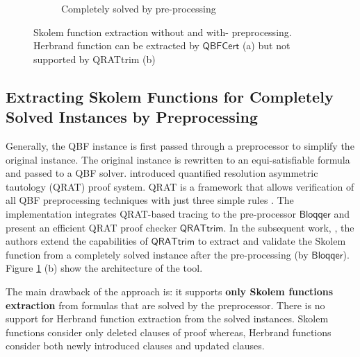 \documentclass[runningheads]{llncs}
\newcommand{\qrpcert}{\mathsf{QBFCert}}
\newcommand{\qtrim}{\mathsf{QRATtrim}}
\newcommand{\bloqqer}{\mathsf{Bloqqer}}
\newcommand{\cheskol}{\mathsf{cheskol}}
\newcommand{\0}{0}
\newcommand{\1}{1}
\begin{document}
\begin{figure}
\begin{subfigure}[t]{0.5\textwidth}
	\caption{Completely solved by pre-processing}
\end{subfigure}

\caption{Skolem function extraction without and with- preprocessing. Herbrand function can be extracted by $\qrpcert$ (a) but not supported by QRATtrim (b)}\label{fig:tool}
\end{figure}

\subsection{Extracting Skolem Functions for Completely Solved Instances by Preprocessing} \label{subsec:skolem-pre}

Generally, the QBF instance is first passed through a preprocessor to simplify the original instance. The original instance is rewritten to an equi-satisfiable formula and passed to a QBF solver. \cite{HeuleSB14a} introduced quantified resolution asymmetric tautology (QRAT) proof system. QRAT is a framework that allows verification of all QBF preprocessing techniques with just three simple rules \cite{HeuleSB14a}. The implementation integrates QRAT-based tracing to the pre-processor $\bloqqer$ \cite{Biere2011} and present an efficient QRAT proof checker $\qtrim$.
In the subsequent work, \cite{HeuleSB14}, the authors extend the capabilities of $\qtrim$ to extract and validate the Skolem function from a completely solved instance after the pre-processing (by $\bloqqer$). 
Figure \ref{fig:tool} (b) show the architecture of the tool.

The main drawback of the approach is: it supports \textbf{only Skolem functions extraction} from formulas that are solved by the preprocessor. There is no support for Herbrand function extraction from the solved instances. Skolem functions consider only deleted clauses of proof whereas, Herbrand functions consider both newly introduced clauses and updated clauses. 
\end{document}
